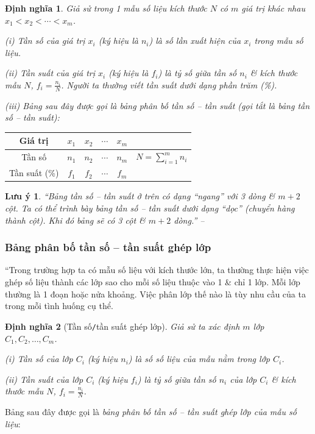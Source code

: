 \documentclass[oneside]{book}
\numberwithin{equation}{section}
\newtheorem{dinhnghia}{Định nghĩa}[section]
\newtheorem{luuy}{Lưu ý}[section]
\begin{document}
\begin{dinhnghia}
	Giả sử trong 1 mẫu số liệu kích thước $N$ có $m$ giá trị khác nhau $x_1 < x_2 < \cdots < x_m$.
	\begin{enumerate*}
		\item[(i)] \emph{Tần số} của giá trị $x_i$ (ký hiệu là $n_i$) là số lần xuất hiện của $x_i$ trong mẫu số liệu.
		\item[(ii)] \emph{Tần suất} của giá trị $x_i$ (ký hiệu là $f_i$) là tỷ số giữa tần số $n_i$ \& kích thước mẫu $N$, $f_i = \frac{n_i}{N}$. Người ta thường viết tần suất dưới dạng phần trăm (\%).
		\item[(iii)] Bảng sau đây được gọi là \emph{bảng phân bố tần số -- tần suất} (gọi tắt là \emph{bảng tần số -- tần suất}):
	\end{enumerate*}
\end{dinhnghia}
\begin{table}[H]
	\centering
	\begin{tabular}{|c|c|c|c|c|c|}
		\hline
		Giá trị & $x_1$ & $x_2$ & $\cdots$ & $x_m$ &  \\
		\hline
		Tần số & $n_1$ & $n_2$ & $\cdots$ & $n_m$ & $N = \sum_{i=1}^m n_i$ \\
		\hline
		Tần suất (\%) & $f_1$ & $f_2$ & $\cdots$ & $f_m$ & \\
		\hline
	\end{tabular}
\end{table}

\begin{luuy}
	``Bảng tần số -- tần suất ở trên có dạng ``ngang'' với 3 dòng \& $m + 2$ cột. Ta có thể trình bày bảng tần số -- tần suất dưới dạng ``dọc'' (chuyển hàng thành cột). Khi đó bảng sẽ có 3 cột \& $m + 2$ dòng.'' -- \cite[p. 63]{TL_chuyen_Toan_Dai_So_Giai_Tich_11}
\end{luuy}

\subsubsection{Bảng phân bố tần số -- tần suất ghép lớp}
``Trong trường hợp ta có mẫu số liệu với kích thước lớn, ta thường thực hiện việc ghép số liệu thành các lớp sao cho mỗi số liệu thuộc vào 1 \& chỉ 1 lớp. Mỗi lớp thường là 1 đoạn hoặc nửa khoảng. Việc phân lớp thế nào là tùy nhu cầu của ta trong mỗi tình huống cụ thể.

\begin{dinhnghia}[Tần số\texttt{/}tần suất ghép lớp]
	Giả sử ta xác định $m$ lớp $C_1,C_2,\ldots,C_m$.
	\begin{enumerate*}
		\item[(i)] \emph{Tần số của lớp $C_i$} (ký hiệu $n_i$) là số số liệu của mẫu nằm trong lớp $C_i$.
		\item[(ii)] \emph{Tần suất của lớp $C_i$} (ký hiệu $f_i$) là tỷ số giữa tần số $n_i$ của lớp $C_i$ \& kích thước mẫu $N$, $f_i = \frac{n_i}{N}$.
	\end{enumerate*}
\end{dinhnghia}
Bảng sau đây được gọi là \textit{bảng phân bố tần số -- tần suất ghép lớp của mẫu số liệu}:
\end{document}

